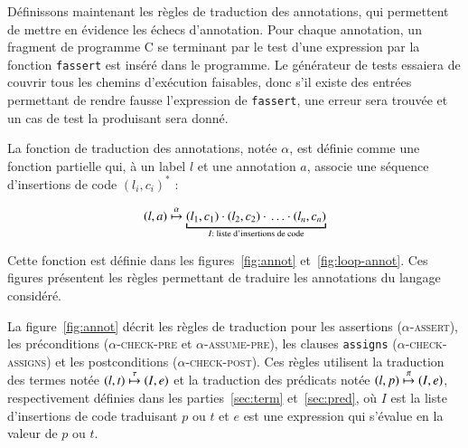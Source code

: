 Définissons maintenant les règles de traduction des
annotations, qui permettent de mettre en évidence les échecs d'annotation.
Pour chaque annotation, un fragment de programme C se terminant par le test
d'une expression par la fonction \lstinline'fassert' est inséré dans le
programme.
Le générateur de tests essaiera de couvrir tous les chemins d'exécution
faisables, donc s'il existe des entrées permettant de rendre fausse
l'expression de \lstinline'fassert', une erreur sera trouvée et un cas de test
la produisant sera donné.

La fonction de traduction des annotations, notée $\alpha$, est définie comme une
fonction partielle qui, à un label $l$ et une annotation $a$,
associe une séquence d'insertions de code $(l_i, c_i)^*$ :

\[
(l, a) \arule
\underbracket{(l_1, c_1) \concat (l_2, c_2) \concat \ldots
  \concat (l_n, c_n)}_{I : \text{ liste d'insertions de code}}
\]

Cette fonction est définie dans les figures~\ref{fig:annot}
et~\ref{fig:loop-annot}.
Ces figures présentent les règles permettant de traduire les annotations du
langage \eacsl considéré.



La figure~\ref{fig:annot} décrit les règles de traduction pour les assertions
(\textsc{$\alpha$-assert}), les préconditions (\textsc{$\alpha$-check-pre} et
\textsc{$\alpha$-assume-pre}), les clauses \lstinline'assigns'
(\textsc{$\alpha$-check-assigns}) et les postconditions
(\textsc{$\alpha$-check-post}).
Ces règles utilisent la traduction des termes notée $(l, t) \overset{\tau}{\mapsto} (I, e)$ et
la traduction des prédicats notée $(l, p) \overset{\pi}{\mapsto} (I, e)$, respectivement
définies dans les parties~\ref{sec:term} et~\ref{sec:pred}, où $I$ est la liste
d'insertions de code traduisant $p$ ou $t$ et $e$ est une expression qui
s'évalue en la valeur de $p$ ou $t$.


